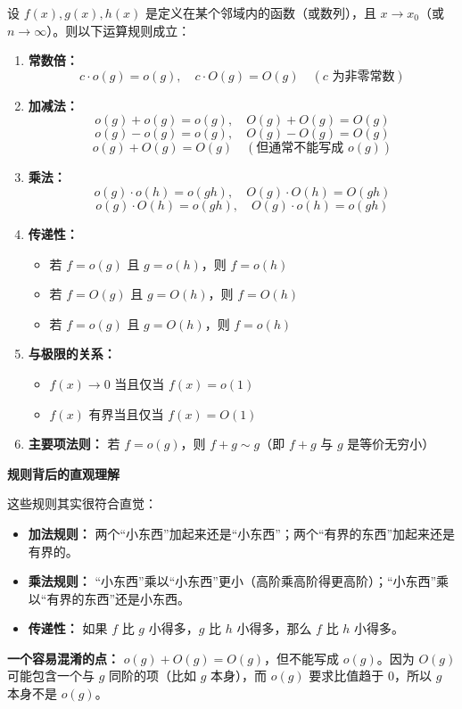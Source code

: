 \documentclass{ctexart}
\newenvironment{custom}[1]{\par\noindent \textbf{#1}\quad}{\par\vspace{1em}}
\begin{document}
\begin{theorem}[小 \(o\) 与大 \(O\) 的运算性质]
设 \(f(x), g(x), h(x)\) 是定义在某个邻域内的函数（或数列），且 \(x \to x_0\)（或 \(n \to \infty\)）。则以下运算规则成立：

\begin{enumerate}
\item \textbf{常数倍：}
   \[
   c \cdot o(g) = o(g),\quad c \cdot O(g) = O(g) \quad (c \text{ 为非零常数})
   \]

\item \textbf{加减法：}
   \[
   o(g) + o(g) = o(g),\quad O(g) + O(g) = O(g)
   \]
   \[
   o(g) - o(g) = o(g),\quad O(g) - O(g) = O(g)
   \]
   \[
   o(g) + O(g) = O(g) \quad (\text{但通常不能写成 } o(g))
   \]

\item \textbf{乘法：}
   \[
   o(g) \cdot o(h) = o(gh),\quad O(g) \cdot O(h) = O(gh)
   \]
   \[
   o(g) \cdot O(h) = o(gh),\quad O(g) \cdot o(h) = o(gh)
   \]

\item \textbf{传递性：}
   \begin{itemize}
   \item 若 \(f = o(g)\) 且 \(g = o(h)\)，则 \(f = o(h)\)
   \item 若 \(f = O(g)\) 且 \(g = O(h)\)，则 \(f = O(h)\)
   \item 若 \(f = o(g)\) 且 \(g = O(h)\)，则 \(f = o(h)\)
   \end{itemize}

\item \textbf{与极限的关系：}
   \begin{itemize}
   \item \(f(x) \to 0\) 当且仅当 \(f(x) = o(1)\)
   \item \(f(x)\) 有界当且仅当 \(f(x) = O(1)\)
   \end{itemize}

\item \textbf{主要项法则：} 若 \(f = o(g)\)，则 \(f + g \sim g\)（即 \(f+g\) 与 \(g\) 是等价无穷小）
\end{enumerate}
\end{theorem}

\begin{custom}{规则背后的直观理解}

这些规则其实很符合直觉：

\begin{itemize}
\item \textbf{加法规则：} 两个“小东西”加起来还是“小东西”；两个“有界的东西”加起来还是有界的。
\item \textbf{乘法规则：} “小东西”乘以“小东西”更小（高阶乘高阶得更高阶）；“小东西”乘以“有界的东西”还是小东西。
\item \textbf{传递性：} 如果 \(f\) 比 \(g\) 小得多，\(g\) 比 \(h\) 小得多，那么 \(f\) 比 \(h\) 小得多。
\end{itemize}

\textbf{一个容易混淆的点：} \(o(g) + O(g) = O(g)\)，但不能写成 \(o(g)\)。因为 \(O(g)\) 可能包含一个与 \(g\) 同阶的项（比如 \(g\) 本身），而 \(o(g)\) 要求比值趋于 0，所以 \(g\) 本身不是 \(o(g)\)。
\end{custom}
\end{document}
